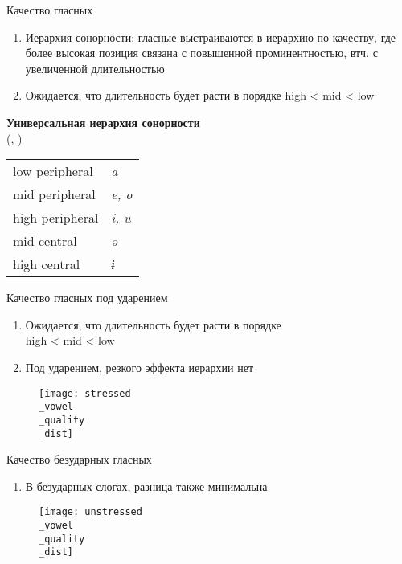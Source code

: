 \documentclass[10 pt, handout]{beamer}
\begin{document}
\begin{frame}[fragile]{Качество гласных}

	\begin{enumerate}[\ding{72}]
		\item Иерархия сонорности: гласные выстраиваются в иерархию по качеству, где более высокая позиция связана с повышенной проминентностью, втч. с увеличенной длительностью \parencite{kenstowicz1997, delacy2002, parker2002}
		\item Ожидается, что длительность будет расти в порядке high < mid < low
	\end{enumerate}
	
	\ex\label{ex:son-hierarchy}
		\textbf{Универсальная иерархия сонорности} \\ (\cite[162]{kenstowicz1997}, \cite[55]{delacy2002})\\
		\vspace*{.5em}
\begin{table}[H]
\begin{tabular}{ll}
low peripheral  & \emph{a}    \\[.1em]
mid peripheral  & \emph{e, o} \\[.1em]
high peripheral & \emph{i, u} \\[.1em]
mid central     & \emph{ə}    \\[.1em]
high central    & \emph{ɨ}   
\end{tabular}
\end{table}	
	\xe	
	
\end{frame}

\begin{frame}{Качество гласных под ударением}

	\begin{enumerate}[\ding{167}]
		\item Ожидается, что длительность будет расти в порядке\\ high < mid < low
		\item Под ударением, резкого эффекта иерархии нет
	\end{enumerate}
	
	\begin{figure}[H]
		\texttt{[image: stressed\\\_vowel\\\_quality\\\_dist]}
	\end{figure}

\end{frame}

\begin{frame}{Качество безударных гласных}

	\begin{enumerate}[\ding{45}]
		\item В безударных слогах, разница также минимальна
	\end{enumerate}
	
	\begin{figure}[H]
		\texttt{[image: unstressed\\\_vowel\\\_quality\\\_dist]}
	\end{figure}

\end{frame}
\end{document}
